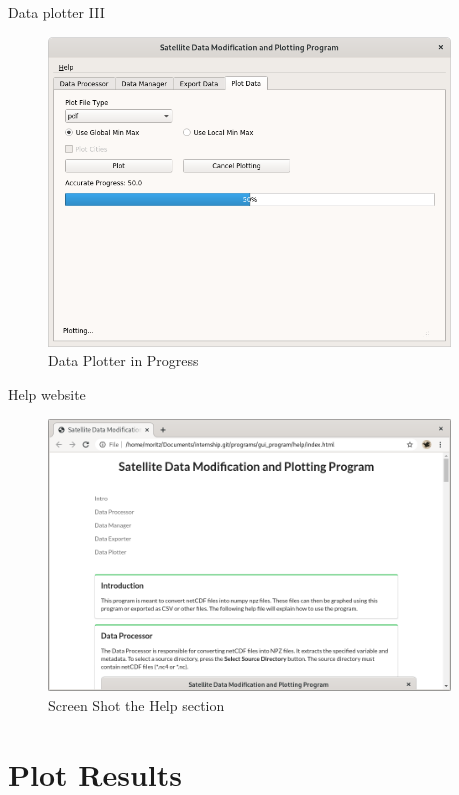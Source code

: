 \documentclass[
    hyperref={
        final,
        colorlinks=true,
        menucolor=black,
        anchorcolor=green,
        linkcolor=blue,
        citecolor=red,
        pdftitle={RS RAS Internship Presentation},
        pdfauthor={Moritz M. Konarski}
    }
]{beamer}
\begin{document}
\begin{frame}{Data plotter III}
\begin{figure}
    \includegraphics[width=0.95\textwidth]{../graphics/dpl03}
    \vspace{-8pt}
    \caption{Data Plotter in Progress}
\end{figure}
\end{frame}

\begin{frame}{Help website}
\begin{figure}
    \center
    \includegraphics[width=0.95\textwidth]{../graphics/help}
    \vspace{-8pt}
    \caption{Screen Shot the Help section}
\end{figure}
\end{frame}

\section{Plot Results}
\end{document}
